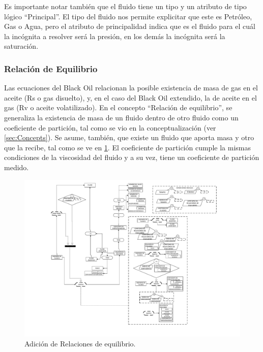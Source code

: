 Es importante notar también que el fluido tiene un tipo y un atributo de tipo lógico ``Principal''. El tipo del fluido nos permite explicitar que este es Petróleo, Gas o Agua, pero el atributo de principalidad indica que es el fluido para el cuál la incógnita a resolver será la presión, en los demás la incógnita será la saturación.

\subsubsection{Relación de Equilibrio}\label{sec:PS_Equilibrium}
Las ecuaciones del Black Oil relacionan la posible existencia de masa de gas en el aceite (Rs o gas disuelto), y, en el caso del Black Oil extendido, la de aceite en el gas (Rv o aceite volatilizado). En el concepto ``Relación de equilibrio'', se generaliza la existencia de masa de un fluido dentro de otro fluido como un coeficiente de partición, tal como se vio en la conceptualización (ver \ref{sec:Concepts}). Se asume, también, que existe un fluido que aporta masa y otro que la recibe, tal como se ve en \ref{fig:EqRelation}. El coeficiente de partición cumple la mismas condiciones de la viscosidad del fluido y a su vez, tiene un coeficiente de partición medido. 

\begin{figure}[h]
	\centering%
	\includegraphics[width=0.9\linewidth]{Kap4/Equilibrium.pdf}%
	\caption{Adición de Relaciones de equilibrio.} \label{fig:EqRelation}
\end{figure}

